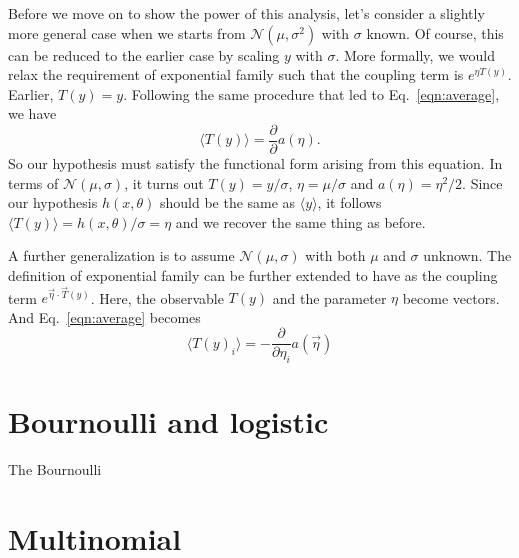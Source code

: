 Before we move on to show the power of this analysis, let's consider a slightly more general case when we starts from $\mathcal N(\mu, \sigma^2)$ with $\sigma$ known. Of course, this can be reduced to the earlier case by scaling $y$ with $\sigma$. More formally, we would relax the requirement of exponential family such that the coupling term is $e^{\eta T(y)}$. Earlier, $T(y) = y$. Following the same procedure that led to Eq.~\ref{eqn:average}, we have
\begin{equation}
	\langle T(y)\rangle = \frac{\partial}{\partial}a(\eta).
\end{equation}
So our hypothesis must satisfy the functional form arising from this equation. In terms of $\mathcal N(\mu, \sigma)$, it turns out $T(y) = y/\sigma$, $\eta = \mu/\sigma$ and $a(\eta) = \eta^2/2$. Since our hypothesis $h(x, \theta)$ should be the same as $\langle y\rangle$, it follows $\langle T(y)\rangle = h(x, \theta)/\sigma = \eta$ and we recover the same thing as before.

A further generalization is to assume $\mathcal N(\mu, \sigma)$ with both $\mu$ and $\sigma$ unknown. The definition of exponential family can be further extended to have as the coupling term $e^{\vec\eta\cdot\vec T(y)}$. Here, the observable $T(y)$ and the parameter $\eta$ become vectors. And Eq.~\ref{eqn:average} becomes
\begin{equation}
	\langle T(y)_i \rangle =-\frac{\partial}{\partial\eta_i}a(\vec\eta)
\end{equation}


\section{Bournoulli and logistic}\label{sec:Bounoulli}
The Bournoulli

\section{Multinomial}

